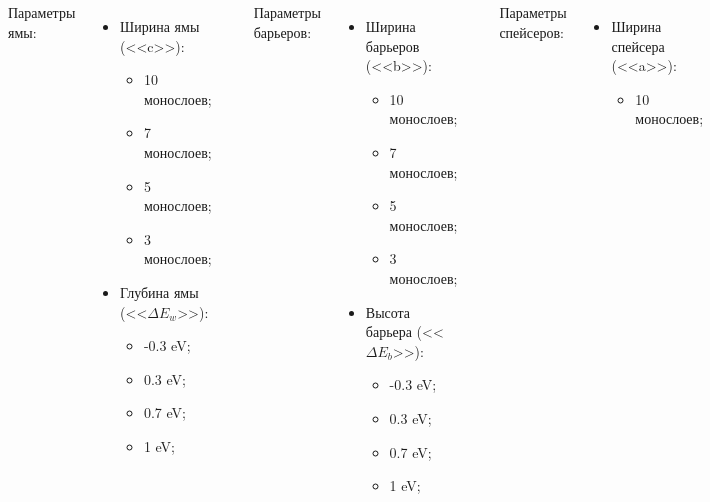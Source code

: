 \documentclass[10pt,pdf,hyperref={unicode},aspectratio={169}]{beamer}
\begin{document}
\begin{frame}
\begin{columns}
	{\color{red} Параметры ямы:}
	\footnotesize
	\begin{itemize}
		\item Ширина ямы (<<c>>): \begin{itemize}
			\footnotesize
			\item 10 монослоев;
			\item 7 монослоев;
			\item 5 монослоев;
			\item 3 монослоев;
		\end{itemize}
		\item Глубина ямы (<<$\Delta E_{w}$>>): \begin{itemize}
			\footnotesize
			\item -0.3 eV;
			\item 0.3 eV;
			\item 0.7 eV;
			\item 1 eV;
		\end{itemize} 
	\end{itemize}
	\rule[0mm]{0.2ex}{40mm}
	{\color{red} Параметры барьеров:}
	\footnotesize
	\begin{itemize}
		\item Ширина барьеров (<<b>>): \begin{itemize}
			\footnotesize
			\item 10 монослоев;
			\item 7 монослоев;
			\item 5 монослоев;
			\item 3 монослоев;
		\end{itemize}
		\item Высота барьера (<<$\Delta E_{b}$>>): \begin{itemize}
			\footnotesize
			\item -0.3 eV;
			\item 0.3 eV;
			\item 0.7 eV;
			\item 1 eV;
		\end{itemize} 
	\end{itemize}
	\rule[0mm]{0.2ex}{40mm}
	{\color{red} Параметры спейсеров:}
	\footnotesize
	\begin{itemize}
		\item Ширина спейсера (<<a>>): \begin{itemize}
			\footnotesize
			\item 10 монослоев;

\end{itemize}
\end{itemize}
\end{columns}
\end{frame}
\end{document}
